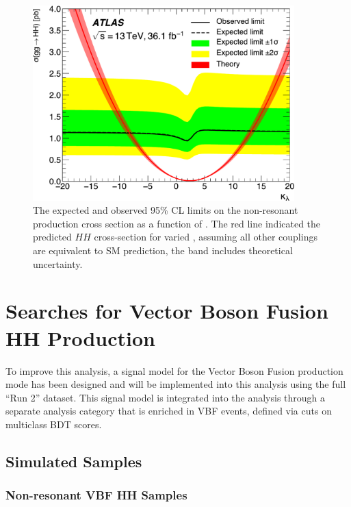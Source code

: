 \begin{figure}[htbp]
  \centering
\includegraphics[width=0.9\textwidth]{chapters/chapter5_yybb/images/limits/lambda.pdf}
\caption[The expected and observed limits on the non-resonant \HH production cross section as a function of \klambda]
{The expected and observed 95\% \gls{CL} limits on the non-resonant \HH production cross section as a function of \klambda. The red line indicated the predicted $HH$ cross-section for varied \klambda, assuming all other couplings are equivalent to \gls{SM} prediction, the band includes theoretical uncertainty.} 
\label{fig:limits-klambda}
\end{figure}

\section{Searches for Vector Boson Fusion HH Production}

To improve this analysis, a signal model for the Vector Boson Fusion production mode has been designed and will be implemented into this analysis using the full ``Run 2'' dataset. This signal model is integrated into the analysis through a separate analysis category that is enriched in VBF events, defined via cuts on multiclass \gls{BDT} scores.

\subsection{Simulated Samples}

\subsubsection{Non-resonant VBF HH Samples}

